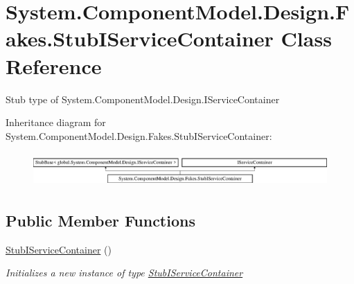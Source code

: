 \hypertarget{class_system_1_1_component_model_1_1_design_1_1_fakes_1_1_stub_i_service_container}{\section{System.\-Component\-Model.\-Design.\-Fakes.\-Stub\-I\-Service\-Container Class Reference}
\label{class_system_1_1_component_model_1_1_design_1_1_fakes_1_1_stub_i_service_container}
}


Stub type of System.\-Component\-Model.\-Design.\-I\-Service\-Container 


Inheritance diagram for System.\-Component\-Model.\-Design.\-Fakes.\-Stub\-I\-Service\-Container\-:\begin{figure}[H]
\begin{center}
\leavevmode
\includegraphics[height=1.314554cm]{class_system_1_1_component_model_1_1_design_1_1_fakes_1_1_stub_i_service_container}
\end{center}
\end{figure}
\subsection*{Public Member Functions}
\begin{DoxyCompactItemize}
\item 
\hyperlink{class_system_1_1_component_model_1_1_design_1_1_fakes_1_1_stub_i_service_container_af5120acf35cdfe18a869aba955658957}{Stub\-I\-Service\-Container} ()
\begin{DoxyCompactList}\small\item\em Initializes a new instance of type \hyperlink{class_system_1_1_component_model_1_1_design_1_1_fakes_1_1_stub_i_service_container}{Stub\-I\-Service\-Container}\end{DoxyCompactList}\end{DoxyCompactItemize}
